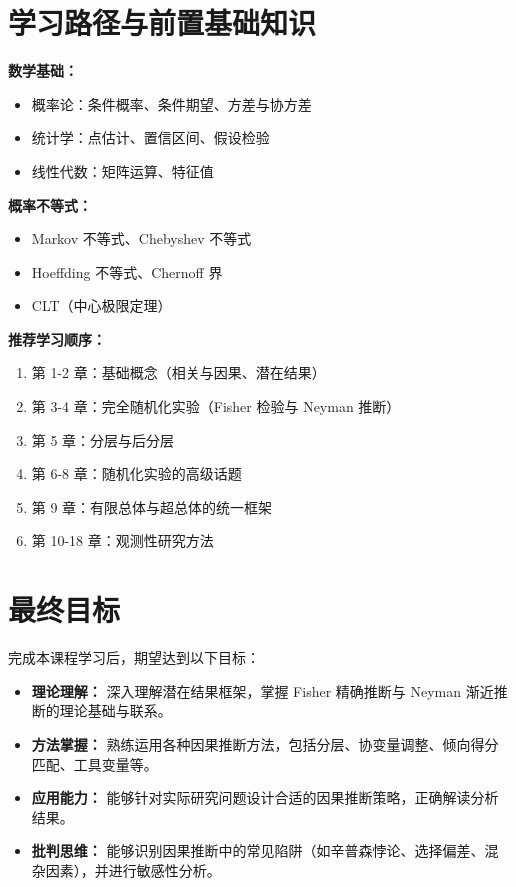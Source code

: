 \section{学习路径与前置基础知识}

\textbf{数学基础：}
\begin{itemize}
    \item 概率论：条件概率、条件期望、方差与协方差
    \item 统计学：点估计、置信区间、假设检验
    \item 线性代数：矩阵运算、特征值
\end{itemize}

\textbf{概率不等式：}
\begin{itemize}
    \item Markov 不等式、Chebyshev 不等式
    \item Hoeffding 不等式、Chernoff 界
    \item CLT（中心极限定理）
\end{itemize}

\textbf{推荐学习顺序：}
\begin{enumerate}
    \item 第 1-2 章：基础概念（相关与因果、潜在结果）
    \item 第 3-4 章：完全随机化实验（Fisher 检验与 Neyman 推断）
    \item 第 5 章：分层与后分层
    \item 第 6-8 章：随机化实验的高级话题
    \item 第 9 章：有限总体与超总体的统一框架
    \item 第 10-18 章：观测性研究方法
\end{enumerate}

\section{最终目标}

完成本课程学习后，期望达到以下目标：

\begin{itemize}
    \item \textbf{理论理解：} 深入理解潜在结果框架，掌握 Fisher 精确推断与 Neyman 渐近推断的理论基础与联系。
    \item \textbf{方法掌握：} 熟练运用各种因果推断方法，包括分层、协变量调整、倾向得分匹配、工具变量等。
    \item \textbf{应用能力：} 能够针对实际研究问题设计合适的因果推断策略，正确解读分析结果。
    \item \textbf{批判思维：} 能够识别因果推断中的常见陷阱（如辛普森悖论、选择偏差、混杂因素），并进行敏感性分析。
\end{itemize}
